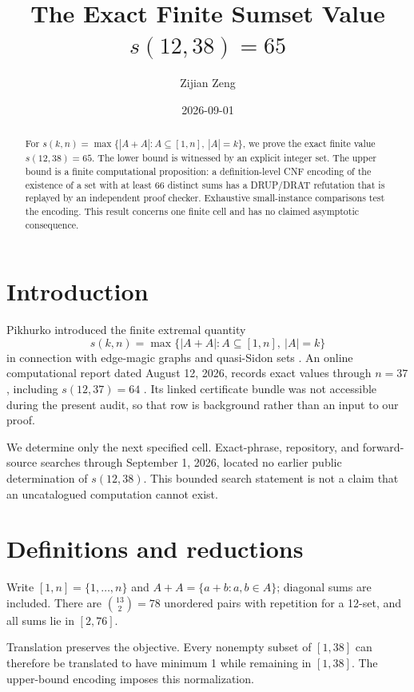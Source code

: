 \documentclass[11pt]{amsart}
\title{The Exact Finite Sumset Value \(s(12,38)=65\)}
\author{Zijian Zeng}
\date{2026-09-01}
\theoremstyle{definition}
\begin{document}
\begin{abstract}
For \(s(k,n)=\max\{|A+A|:A\subseteq[1,n],\ |A|=k\}\), we prove the
exact finite value \(s(12,38)=65\).  The lower bound is witnessed by an
explicit integer set.  The upper bound is a finite computational proposition:
a definition-level CNF encoding of the existence of a set with at least 66
distinct sums has a DRUP/DRAT refutation that is replayed by an independent
proof checker.  Exhaustive small-instance comparisons test the encoding.
This result concerns one finite cell and has no claimed asymptotic consequence.
\end{abstract}

\maketitle
\enlargethispage{4pt}

\section{Introduction}

Pikhurko introduced the finite extremal quantity
\[
s(k,n)=\max\{|A+A|:A\subseteq[1,n],\ |A|=k\}
\]
in connection with edge-magic graphs and quasi-Sidon sets
\cite{Pikhurko2006}.  An online computational report dated August 12, 2026,
records exact values through \(n=37\), including \(s(12,37)=64\)
\cite{EPAD840}.  Its linked certificate bundle was not accessible during the
present audit, so that row is background rather than an input to our proof.

We determine only the next specified cell.  Exact-phrase, repository, and
forward-source searches through September 1, 2026, located no earlier public
determination of \(s(12,38)\).  This bounded search statement is not a claim
that an uncatalogued computation cannot exist.

\section{Definitions and reductions}

Write \([1,n]=\{1,\ldots,n\}\) and
\(A+A=\{a+b:a,b\in A\}\); diagonal sums are included.  There are
\(\binom{13}{2}=78\) unordered pairs with repetition for a 12-set, and all
sums lie in \([2,76]\).

Translation preserves the objective.  Every nonempty subset of \([1,38]\)
can therefore be translated to have minimum 1 while remaining in
\([1,38]\).  The upper-bound encoding imposes this normalization.
\end{document}
